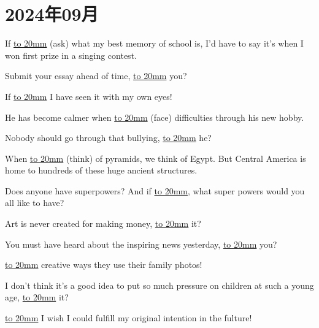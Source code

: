 \section{2024年09月}

\item {
    If \underline{\hbox to 20mm{}} (ask) what my best memory of school is, I'd have to say it's when I won first prize in a singing contest. 
} 
\\
\item {
    Submit your essay ahead of time, \underline{\hbox to 20mm{}} you?
} 
\\
\item {
    If \underline{\hbox to 20mm{}} I have seen it with my own eyes!
} 
\\
\item {
    He has become calmer when \underline{\hbox to 20mm{}} (face) difficulties through his new hobby.
} 
\\
\item {
    Nobody should go through that bullying, \underline{\hbox to 20mm{}} he?
} 
\\
\item {
    When \underline{\hbox to 20mm{}} (think) of pyramids, we think of Egypt. But Central America is home to hundreds of these huge ancient structures.
} 
\\
\item {
    Does anyone have superpowers? And if \underline{\hbox to 20mm{}}, what super powers would you all like to have?
} 
\\
\item {
    Art is never created for making money, \underline{\hbox to 20mm{}} it?
} 
\\
\item {
    You must have heard about the inspiring news yesterday,  \underline{\hbox to 20mm{}} you?
} 
\\
\item {
    \underline{\hbox to 20mm{}} creative ways they use their family photos!
} 
\\
\item {
    I don't think it's a good idea to put so much pressure on children at such a young age, \underline{\hbox to 20mm{}} it?
} 
\\
\item {
    \underline{\hbox to 20mm{}} I wish I could fulfill my original intention in the fulture!
} 
